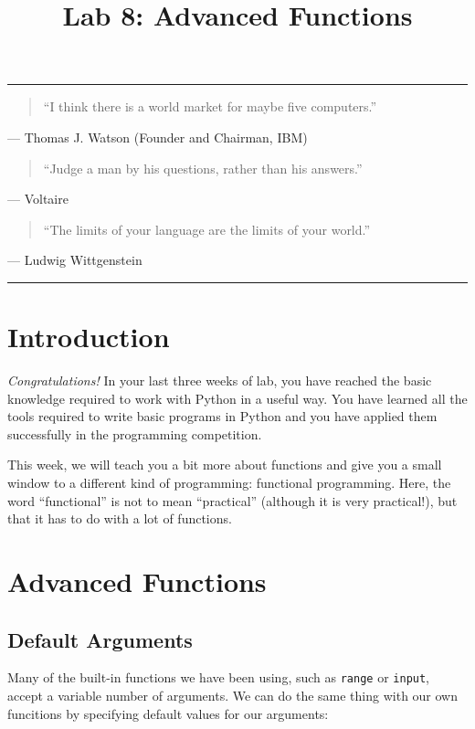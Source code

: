 \documentclass[11pt]{cselabheader}
\title{Lab 8: Advanced Functions}
\begin{document}
\maketitle

\hrule
\begin{quotation}
``I think there is a world market for maybe five computers.''
\end{quotation}
\begin{flushright}
--- Thomas J. Watson (Founder and Chairman, IBM)
\end{flushright}

\begin{quotation}
``Judge a man by his questions, rather than his answers.''
\end{quotation}
\begin{flushright}
--- Voltaire
\end{flushright}

\begin{quotation}
``The limits of your language are the limits of your world.''
\end{quotation}
\begin{flushright}
--- Ludwig Wittgenstein
\end{flushright}

\hrule

\section{Introduction}
\emph{Congratulations!} In your last three weeks of lab, you have reached the
basic knowledge required to work with Python in a useful way. You have learned
all the tools required to write basic programs in Python and you have applied
them successfully in the programming competition.

This week, we will teach you a bit more about functions and give you a small
window to a different kind of programming: functional programming. Here, the
word ``functional'' is not to mean ``practical'' (although it is very
practical!), but that it has to do with a lot of functions.

\pagebreak
\section{Advanced Functions}
\label{sec:advfun}

\subsection{Default Arguments}
\label{subsec:arg}
Many of the built-in functions we have been using, such as \lstinline{range} or
\lstinline{input}, accept a variable number of arguments. We can do the same
thing with our own funcitions by specifying default values for our arguments:
\end{document}
